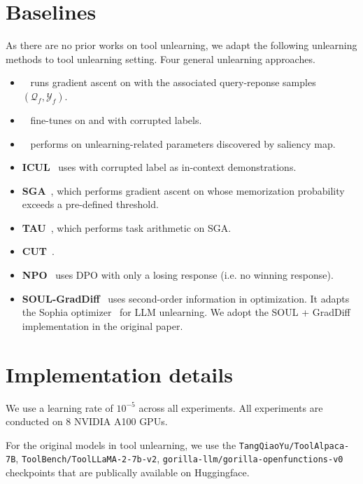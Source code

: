 \section{Baselines}\label{sec:baseline}
As there are no prior works on tool unlearning, we adapt the following unlearning methods to tool unlearning setting.
Four general unlearning approaches.
\begin{itemize}
    \item \textbf{\GA}~\citep{Golatkar2020EternalSO,yao-etal-2024-machine} runs gradient ascent on \tf with the associated query-reponse samples $(\mathcal{Q}_f, \mathcal{Y}_f)$.
    \item \textbf{\RL}~\citep{amnesiac_2021} fine-tunes on \tr and \tf with corrupted labels. 
    \item \textbf{\SU}~\citep{fan2024salun} performs \RL on unlearning-related parameters discovered by saliency map. 
    \item \textbf{ICUL}~\citep{icul} uses \tf with corrupted label as in-context demonstrations. 
    \item \textbf{SGA}~\citep{jang-etal-2023-knowledge,barbulescu2024textual}, which performs gradient ascent on \tf whose memorization probability exceeds a pre-defined threshold.
    \item \textbf{TAU}~\citep{barbulescu2024textual}, which performs task arithmetic on SGA.
    \item \textbf{CUT}~\citep{li2024wmdp}.
    \item \textbf{NPO}~\citep{zhang2024negative} uses DPO with only a losing response (i.e. no winning response).
    \item \textbf{SOUL-GradDiff}~\citep{jia-etal-2024-soul} uses second-order information in optimization. It adapts the Sophia optimizer~\citep{liu2024sophia} for LLM unlearning. We adopt the SOUL + GradDiff~\citep{maini2024tofu} implementation in the original paper.
\end{itemize}


\section{Implementation details}
We use a learning rate of $10^{-5}$ across all experiments. All experiments are conducted on 8 NVIDIA A100 GPUs.

For the original models in tool unlearning, we use the \texttt{TangQiaoYu/ToolAlpaca-7B}, \texttt{ToolBench/ToolLLaMA-2-7b-v2}, \texttt{gorilla-llm/gorilla-openfunctions-v0} checkpoints that are publically available on Huggingface.


